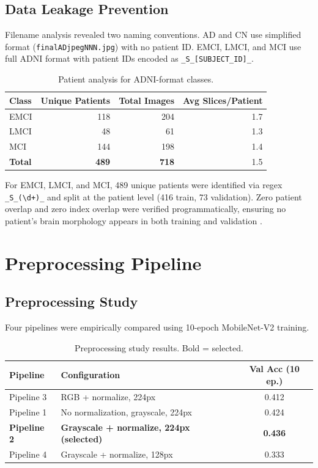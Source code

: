 \documentclass[12pt, a4paper]{article}
\begin{document}
\subsection{Data Leakage Prevention}
Filename analysis revealed two naming conventions. AD and CN
use simplified format (\texttt{finalADjpegNNN.jpg}) with no
patient ID. EMCI, LMCI, and MCI use full ADNI format with
patient IDs encoded as \texttt{\_S\_[SUBJECT\_ID]\_}.

\begin{table}[H]
\centering
\caption{Patient analysis for ADNI-format classes.}
\label{tab:patients}
\begin{tabular}{lrrr}
\toprule
\textbf{Class} & \textbf{Unique Patients}
    & \textbf{Total Images} & \textbf{Avg Slices/Patient}\\
\midrule
EMCI & 118 & 204 & 1.7\\
LMCI &  48 &  61 & 1.3\\
MCI  & 144 & 198 & 1.4\\
\midrule
\textbf{Total} & \textbf{489} & \textbf{718} & 1.5\\
\bottomrule
\end{tabular}
\end{table}

For EMCI, LMCI, and MCI, 489 unique patients were identified
via regex \texttt{\_S\_(\textbackslash d+)\_} and split at
the patient level (416 train, 73 validation). Zero patient
overlap and zero index overlap were verified
programmatically, ensuring no patient's brain morphology
appears in both training and validation \cite{lim2022}.

\section{Preprocessing Pipeline}

\subsection{Preprocessing Study}

Four pipelines were empirically compared using 10-epoch
MobileNet-V2 training.

\begin{table}[H]
\centering
\caption{Preprocessing study results. Bold = selected.}
\label{tab:prepcomp}
\begin{tabular}{llc}
\toprule
\textbf{Pipeline} & \textbf{Configuration}
    & \textbf{Val Acc (10 ep.)}\\
\midrule
Pipeline 3 & RGB + normalize, 224px          & 0.412\\
Pipeline 1 & No normalization, grayscale, 224px & 0.424\\
\textbf{Pipeline 2} &
    \textbf{Grayscale + normalize, 224px (selected)}
    & \textbf{0.436}\\
Pipeline 4 & Grayscale + normalize, 128px    & 0.333\\
\bottomrule
\end{tabular}
\end{table}
\end{document}
